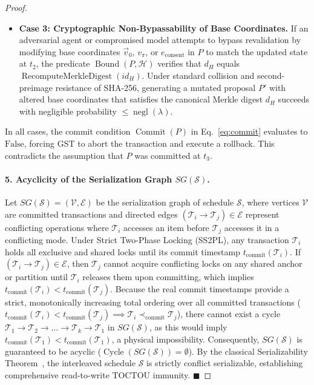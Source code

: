 \documentclass[11pt]{article}
\begin{document}
\begin{proof}
\begin{itemize}
    \item \textbf{Case 3: Cryptographic Non-Bypassability of Base Coordinates.}
    If an adversarial agent or compromised model attempts to bypass revalidation by modifying base coordinates $\vec{v}_0$, $v_{\pi}$, or $e_{\text{consent}}$ in $P$ to match the updated state at $t_2$, the predicate $\operatorname{Bound}(P, \mathcal{H})$ verifies that $d_H$ equals $\operatorname{RecomputeMerkleDigest}(id_H)$. Under standard collision and second-preimage resistance of SHA-256, generating a mutated proposal $P'$ with altered base coordinates that satisfies the canonical Merkle digest $d_H$ succeeds with negligible probability $\le \operatorname{negl}(\lambda)$.
\end{itemize}

In all cases, the commit condition $\operatorname{Commit}(P)$ in Eq.~\ref{eq:commit} evaluates to $\text{False}$, forcing GST to abort the transaction and execute a rollback. This contradicts the assumption that $P$ was committed at $t_3$.

\paragraph{5. Acyclicity of the Serialization Graph $SG(\mathcal{S})$.}
Let $SG(\mathcal{S}) = (\mathcal{V}, \mathcal{E})$ be the serialization graph of schedule $\mathcal{S}$, where vertices $\mathcal{V}$ are committed transactions and directed edges $(\mathcal{T}_i \to \mathcal{T}_j) \in \mathcal{E}$ represent conflicting operations where $\mathcal{T}_i$ accesses an item before $\mathcal{T}_j$ accesses it in a conflicting mode.
Under Strict Two-Phase Locking (SS2PL), any transaction $\mathcal{T}_i$ holds all exclusive and shared locks until its commit timestamp $t_{\text{commit}}(\mathcal{T}_i)$. If $(\mathcal{T}_i \to \mathcal{T}_j) \in \mathcal{E}$, then $\mathcal{T}_j$ cannot acquire conflicting locks on any shared anchor or partition until $\mathcal{T}_i$ releases them upon committing, which implies $t_{\text{commit}}(\mathcal{T}_i) < t_{\text{commit}}(\mathcal{T}_j)$.
Because the real commit timestamps provide a strict, monotonically increasing total ordering over all committed transactions ($t_{\text{commit}}(\mathcal{T}_i) < t_{\text{commit}}(\mathcal{T}_j) \implies \mathcal{T}_i \prec_{\text{commit}} \mathcal{T}_j$), there cannot exist a cycle $\mathcal{T}_1 \to \mathcal{T}_2 \to \dots \to \mathcal{T}_k \to \mathcal{T}_1$ in $SG(\mathcal{S})$, as this would imply $t_{\text{commit}}(\mathcal{T}_1) < t_{\text{commit}}(\mathcal{T}_1)$, a physical impossibility.
Consequently, $SG(\mathcal{S})$ is guaranteed to be acyclic ($\operatorname{Cycle}(SG(\mathcal{S})) = \emptyset$). By the classical Serializability Theorem~\cite{eswaran1976}, the interleaved schedule $\mathcal{S}$ is strictly conflict serializable, establishing comprehensive read-to-write TOCTOU immunity. $\blacksquare$
\end{proof}
\end{document}
